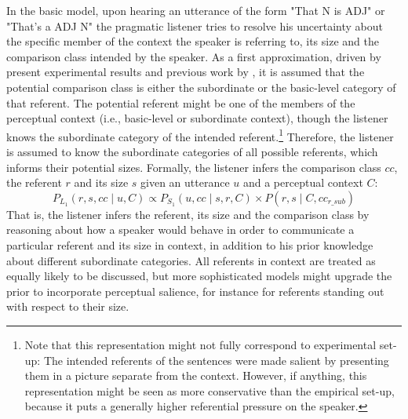In the basic model, upon hearing an utterance of the form "That N is ADJ" or "That's a ADJ N" the pragmatic listener tries to resolve his uncertainty about the specific member of the context the speaker is referring to, its size and the comparison class intended by the speaker. As a first approximation, driven by present experimental results and previous work by \textcite{tessler2017warm}, it is assumed that the potential comparison class is either the subordinate or the basic-level category of that referent. The potential referent might be one of the members of the perceptual context (i.e., basic-level or subordinate context), though the listener knows the subordinate category of the intended referent.\footnote{Note that this representation might not fully correspond to experimental set-up: The intended referents of the sentences were made salient by presenting them in a picture separate from the context. However, if anything, this representation might be seen as more conservative than the empirical set-up, because it puts a generally higher referential pressure on the speaker.} Therefore, the listener is assumed to know the subordinate categories of all possible referents, which informs their potential sizes.
Formally, the listener infers the comparison class $cc$, the referent $r$ and its size $s$ given an utterance $u$ and a perceptual context $C$:
\begin{equation}
P_{L_1} (r, s, cc \mid u, C) \propto P_{S_1} (u, cc \mid s, r, C) \times P(r, s \mid C, cc_{r\_sub}) 
\end{equation}
That is, the listener infers the referent, its size and the comparison class by reasoning about how a speaker would behave in order to communicate a particular referent and its size in context, in addition to his prior knowledge about different subordinate categories. All referents in context are treated as equally likely to be discussed, but more sophisticated models might upgrade the prior to incorporate perceptual salience, for instance for referents standing out with respect to their size. 

